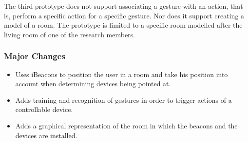 The third prototype does not support associating a gesture with an action, that is, perform a specific action for a specific gesture. Nor does it support creating a model of a room. The prototype is limited to a specific room modelled after the living room of one of the research members.

\subsubsection{Major Changes}
\begin{itemize}
\item Uses iBeacons to position the user in a room and take his position into account when determining devices being pointed at.
\item Adds training and recognition of gestures in order to trigger actions of a controllable device.
\item Adds a graphical representation of the room in which the beacons and the devices are installed.
\end{itemize}

